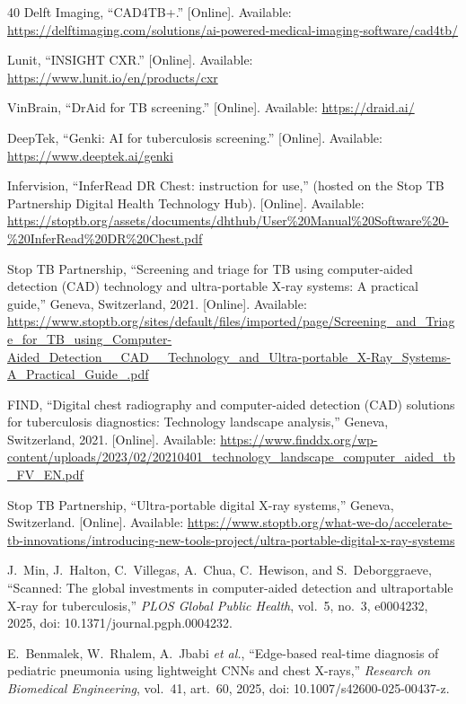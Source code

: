 \documentclass[conference, letterpaper]{IEEEtran}
\begin{document}
\begin{thebibliography}{40}
Delft Imaging, ``CAD4TB+.'' [Online]. Available: \url{https://delftimaging.com/solutions/ai-powered-medical-imaging-software/cad4tb/}

Lunit, ``INSIGHT CXR.'' [Online]. Available: \url{https://www.lunit.io/en/products/cxr}

VinBrain, ``DrAid for TB screening.'' [Online]. Available: \url{https://draid.ai/}

DeepTek, ``Genki: AI for tuberculosis screening.'' [Online]. Available: \url{https://www.deeptek.ai/genki}

Infervision, ``InferRead DR Chest: instruction for use,'' (hosted on the Stop TB Partnership Digital Health Technology Hub). [Online]. Available: \url{https://stoptb.org/assets/documents/dhthub/User\%20Manual\%20Software\%20-\%20InferRead\%20DR\%20Chest.pdf}

Stop TB Partnership, ``Screening and triage for TB using computer-aided detection (CAD) technology and ultra-portable X-ray systems: A practical guide,'' Geneva, Switzerland, 2021. [Online]. Available: \url{https://www.stoptb.org/sites/default/files/imported/page/Screening_and_Triage_for_TB_using_Computer-Aided_Detection__CAD__Technology_and_Ultra-portable_X-Ray_Systems-A_Practical_Guide_.pdf}

FIND, ``Digital chest radiography and computer-aided detection (CAD) solutions for tuberculosis diagnostics: Technology landscape analysis,'' Geneva, Switzerland, 2021. [Online]. Available: \url{https://www.finddx.org/wp-content/uploads/2023/02/20210401_technology_landscape_computer_aided_tb_FV_EN.pdf}

Stop TB Partnership, ``Ultra-portable digital X-ray systems,'' Geneva, Switzerland. [Online]. Available: \url{https://www.stoptb.org/what-we-do/accelerate-tb-innovations/introducing-new-tools-project/ultra-portable-digital-x-ray-systems}

J.~Min, J.~Halton, C.~Villegas, A.~Chua, C.~Hewison, and S.~Deborggraeve, ``Scanned: The global investments in computer-aided detection and ultraportable X-ray for tuberculosis,'' \textit{PLOS Global Public Health}, vol.~5, no.~3, e0004232, 2025, doi: 10.1371/journal.pgph.0004232.

E.~Benmalek, W.~Rhalem, A.~Jbabi \textit{et al.}, ``Edge-based real-time diagnosis of pediatric pneumonia using lightweight CNNs and chest X-rays,'' \textit{Research on Biomedical Engineering}, vol.~41, art.~60, 2025, doi: 10.1007/s42600-025-00437-z.


\end{thebibliography}
\end{document}
